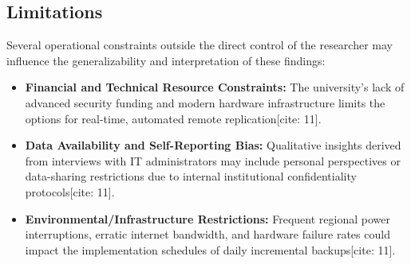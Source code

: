 \documentclass[journal,onecolumn,12pt,twoside]{IEEEtran}
\begin{document}
	\subsection{Limitations}
	\label{subsec:limitations}
	Several operational constraints outside the direct control of the researcher may influence the generalizability and interpretation of these findings:
	\begin{itemize}
		\item \textbf{Financial and Technical Resource Constraints:} The university's lack of advanced security funding and modern hardware infrastructure limits the options for real-time, automated remote replication[cite: 11].
		\item \textbf{Data Availability and Self-Reporting Bias:} Qualitative insights derived from interviews with IT administrators may include personal perspectives or data-sharing restrictions due to internal institutional confidentiality protocols[cite: 11].
		\item \textbf{Environmental/Infrastructure Restrictions:} Frequent regional power interruptions, erratic internet bandwidth, and hardware failure rates could impact the implementation schedules of daily incremental backups[cite: 11].
	\end{itemize}
	
\end{document}
